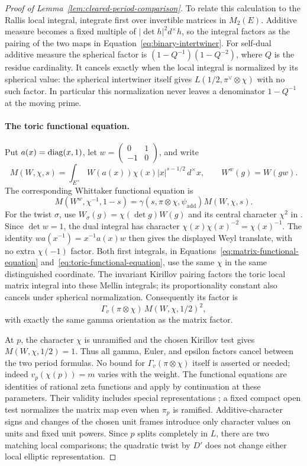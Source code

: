 \begin{proof}[Proof of Lemma~\ref{lem:cleared-period-comparison}]
To relate this calculation to the Rallis local integral, integrate
first over invertible matrices in $M_2(E)$.  Additive measure becomes a
fixed multiple of $|\det h|^2d^\times h$, so the integral factors as the
pairing of the two maps in Equation~\ref{eq:binary-intertwiner}.
For self-dual additive measure the spherical factor is
$(1-Q^{-1})(1-Q^{-2})$, where $Q$ is the residue cardinality.  It
cancels exactly when the local integral is normalized by its spherical
value: the spherical intertwiner itself gives
$L(1/2,\pi^\vee\otimes\chi)$ with no such factor.  In particular this
normalization never leaves a denominator $1-Q^{-1}$ at the moving
prime.

\paragraph{The toric functional equation.}
Put $a(x)=\operatorname{diag}(x,1)$, let
$w=\left(\begin{smallmatrix}0&1\\-1&0\end{smallmatrix}\right)$, and write
\[
 M(W,\chi,s)=\int_{E^\times}W(a(x))\chi(x)|x|^{s-1/2}\,d^\times x,
 \qquad W^w(g)=W(gw).
\]
The corresponding Whittaker functional equation is
\begin{equation}\label{eq:toric-functional-equation}
 M(W^w,\chi^{-1},1-s)
  =\gamma(s,\pi\otimes\chi,\psi_{\mathrm{add}})
    M(W,\chi,s).
\end{equation}
For the twist $\sigma$, use $W_\sigma(g)=\chi(\det g)W(g)$
and its central character $\chi^2$ in
\citet[Theorem~2.18(ii)--(iv)]{JacquetLanglands1970}.
Since $\det w=1$, the dual integral has character
$\chi(x)\chi(x)^{-2}=\chi(x)^{-1}$.
The identity $w a(x^{-1})=x^{-1}a(x)w$ then gives the displayed
Weyl translate, with no extra $\chi(-1)$ factor.  Both first integrals,
in Equations~\ref{eq:matrix-functional-equation}
and~\ref{eq:toric-functional-equation}, use the same $\chi$ in the same
distinguished coordinate.  The invariant Kirillov pairing factors the
toric local matrix integral into these Mellin integrals; its
proportionality constant also cancels under spherical normalization.
Consequently its factor is
\[
 \Gamma_v(\pi\otimes\chi)\,M(W,\chi,1/2)^2,
\]
with exactly the same gamma orientation as the matrix factor.

At $p$, the character $\chi$ is unramified and the chosen Kirillov test
gives $M(W,\chi,1/2)=1$.  Thus all gamma, Euler, and epsilon factors
cancel between the two period formulas.  No bound for
$\Gamma_v(\pi\otimes\chi)$ itself is asserted or needed; indeed
$v_p(\chi(p))=m$ varies with the weight.  The functional equations are
identities of rational zeta functions and apply by continuation at
these parameters.  Their validity includes special representations
\cite[Proposition~3.6 and Corollary~3.7]{JacquetLanglands1970}; a
fixed compact open test normalizes the matrix map even when $\pi_p$ is
ramified.  Additive-character signs and changes of the chosen unit
frames introduce only character values on units and fixed unit
powers.  Since $p$ splits completely in $L$, there are two matching
local comparisons; the quadratic twist by $D'$ does not change either
local elliptic representation.


\end{proof}
